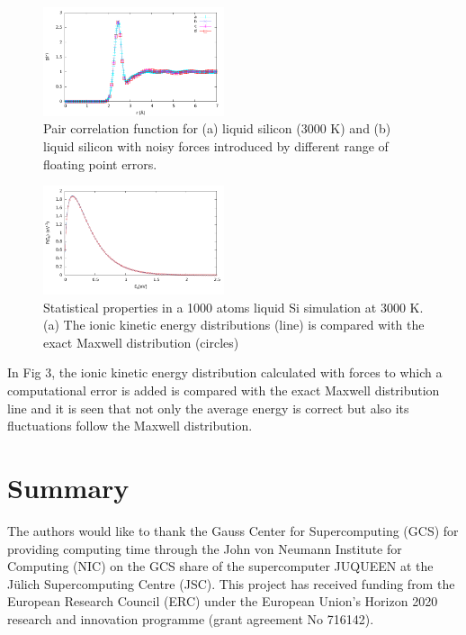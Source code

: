 \documentclass[aps,pre,twocolumn,showpacs,preprintnumbers,amsmath,amssymb]{revtex4-1}
\begin{document}
\begin{figure}[h!]%
\begin{center}
\includegraphics[width=0.475\textwidth]
{rdffloatingpt.pdf}
\end{center}
\caption{\label{Fig2}
Pair correlation function for (a) liquid silicon (3000 K) and (b) liquid silicon with noisy forces introduced by different range of floating point errors.
} \end{figure}

\begin{figure}[h!]%
\begin{center}
\includegraphics[width=0.475\textwidth]
{test1.pdf}
\end{center}
\caption{\label{Fig3}
Statistical properties in a 1000 atoms liquid Si simulation at 3000 K. (a) The ionic kinetic energy distributions (line) is compared with the exact Maxwell distribution (circles)
} \end{figure}

In Fig 3, the ionic kinetic energy distribution calculated with forces to which a computational error is added is compared with the exact Maxwell distribution line and it is seen that not only the average energy is correct but also its fluctuations follow the Maxwell distribution. 



\section{Summary}




\begin{acknowledgments}
The authors would like to thank the Gauss Center for Supercomputing (GCS) for providing computing time through the John von Neumann Institute for Computing (NIC) on the GCS share of the supercomputer JUQUEEN at the J\"ulich Supercomputing Centre (JSC). This project has received funding from the European Research Council (ERC) under the European Union's Horizon 2020 research and innovation programme (grant agreement No 716142).
\end{acknowledgments}
\end{document}
